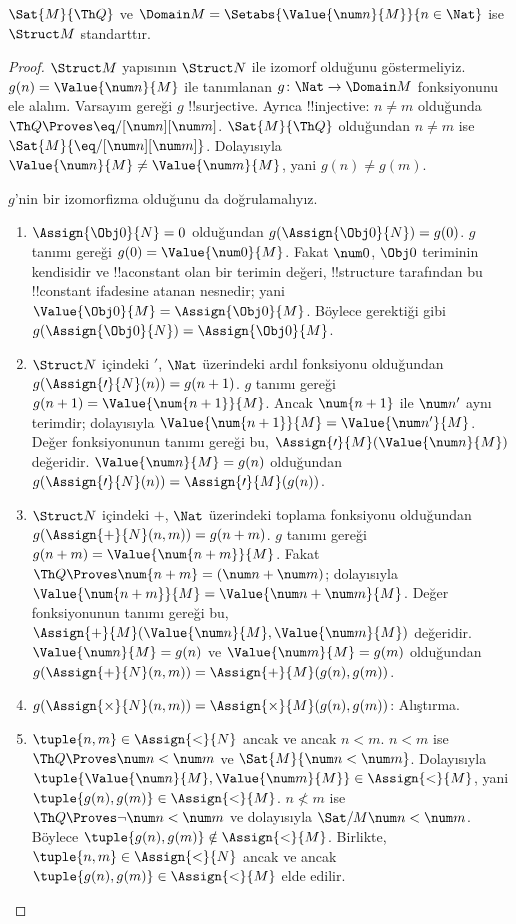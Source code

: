\documentclass[../../../include/open-logic-section]{subfiles}
\begin{document}
\begin{prop}
$\Sat{M}{\Th Q}$ ve
$\Domain M=\Setabs{\Value{\num n}{M}}{n\in\Nat}$ ise $\Struct M$
standarttır.
\end{prop}

\begin{proof}
$\Struct M$ yapısının $\Struct N$ ile izomorf olduğunu göstermeliyiz.
$g(n)=\Value{\num n}{M}$ ile tanımlanan
$g\colon\Nat\to\Domain M$ fonksiyonunu ele alalım. Varsayım gereği
$g$ !!{surjective}. Ayrıca !!{injective}: $n\neq m$ olduğunda
$\Th Q\Proves\eq/[\num n][\num m]$. $\Sat{M}{\Th Q}$ olduğundan
$n\neq m$ ise $\Sat{M}{\eq/[\num n][\num m]}$. Dolayısıyla
$\Value{\num n}{M}\neq\Value{\num m}{M}$, yani $g(n)\neq g(m)$.

$g$'nin bir izomorfizma olduğunu da doğrulamalıyız.
\begin{enumerate}
\item $\Assign{\Obj0}{N}=0$ olduğundan
  $g(\Assign{\Obj0}{N})=g(0)$. $g$ tanımı gereği
  $g(0)=\Value{\num0}{M}$. Fakat $\num0$, $\Obj0$ teriminin
  kendisidir ve !!a{constant} olan bir terimin değeri, !!{structure}
  tarafından bu !!{constant} ifadesine atanan nesnedir; yani
  $\Value{\Obj0}{M}=\Assign{\Obj0}{M}$. Böylece gerektiği gibi
  $g(\Assign{\Obj0}{N})=\Assign{\Obj0}{M}$.
\item $\Struct N$ içindeki $\prime$, $\Nat$ üzerindeki ardıl fonksiyonu
  olduğundan $g(\Assign{\prime}{N}(n))=g(n+1)$. $g$ tanımı gereği
  $g(n+1)=\Value{\num{n+1}}{M}$. Ancak $\num{n+1}$ ile $\num n'$
  aynı terimdir; dolayısıyla
  $\Value{\num{n+1}}{M}=\Value{\num n'}{M}$. Değer fonksiyonunun
  tanımı gereği bu,
  $\Assign{\prime}{M}(\Value{\num n}{M})$ değeridir.
  $\Value{\num n}{M}=g(n)$ olduğundan
  $g(\Assign{\prime}{N}(n))=\Assign{\prime}{M}(g(n))$.
\item $\Struct N$ içindeki $+$, $\Nat$ üzerindeki toplama fonksiyonu
  olduğundan $g(\Assign{+}{N}(n,m))=g(n+m)$. $g$ tanımı gereği
  $g(n+m)=\Value{\num{n+m}}{M}$. Fakat
  $\Th Q\Proves\num{n+m}=(\num n+\num m)$; dolayısıyla
  $\Value{\num{n+m}}{M}=\Value{\num n+\num m}{M}$. Değer
  fonksiyonunun tanımı gereği bu,
  $\Assign{+}{M}(\Value{\num n}{M},\Value{\num m}{M})$ değeridir.
  $\Value{\num n}{M}=g(n)$ ve $\Value{\num m}{M}=g(m)$ olduğundan
  $g(\Assign{+}{N}(n,m))=\Assign{+}{M}(g(n),g(m))$.
\item $g(\Assign{\times}{N}(n,m))=
  \Assign{\times}{M}(g(n),g(m))$: Alıştırma.
\item $\tuple{n,m}\in\Assign{<}{N}$ ancak ve ancak $n<m$. $n<m$ ise
  $\Th Q\Proves\num n<\num m$ ve $\Sat{M}{\num n<\num m}$.
  Dolayısıyla
  $\tuple{\Value{\num n}{M},\Value{\num m}{M}}\in\Assign{<}{M}$,
  yani $\tuple{g(n),g(m)}\in\Assign{<}{M}$. $n\not<m$ ise
  $\Th Q\Proves\lnot\num n<\num m$ ve dolayısıyla
  $\Sat/{M}{\num n<\num m}$. Böylece
  $\tuple{g(n),g(m)}\notin\Assign{<}{M}$. Birlikte,
  $\tuple{n,m}\in\Assign{<}{N}$ ancak ve ancak
  $\tuple{g(n),g(m)}\in\Assign{<}{M}$ elde edilir.
\end{enumerate}
\end{proof}
\end{document}
